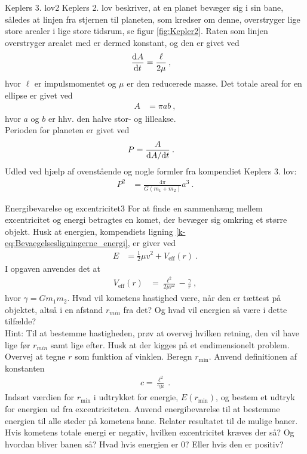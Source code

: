 %
\begin{opgave}{Keplers 3. lov}{2}
Keplers 2. lov beskriver, at en planet bevæger sig i sin bane, således at linjen fra stjernen til planeten, som kredser om denne, overstryger lige store arealer i lige store tidsrum, se figur \ref{fig:Kepler2}. Raten som linjen overstryger arealet med er dermed konstant, og den er givet ved
\begin{align*}
	\dif{t}{A} &= \frac{\ell}{2\mu} \: ,
\end{align*}
hvor $\ell$ er impulsmomentet og $\mu$ er den reducerede masse. Det totale areal for en ellipse er givet ved
\begin{align*}
	A &= \pi a b \: ,
\end{align*}
hvor $a$ og $b$ er hhv. den halve stor- og lilleakse.\\
Perioden for planeten er givet ved
\begin{align*}
	P &= \frac{A}{\d A / \d t} \: .
\end{align*}
%
\opg Udled ved hjælp af ovenstående og nogle formler fra kompendiet Keplers 3. lov:
\begin{align*}
	P^2 &= \frac{4\pi}{G(m_1+m_2)}a^3 \: .
\end{align*}
\end{opgave}
%
%
\begin{opgave}{Energibevarelse og excentricitet}{3}
For at finde en sammenhæng mellem excentricitet og energi betragtes en komet, der bevæger sig omkring et større objekt. Husk at energien, kompendiets ligning \eqref{k-eq:Bevaegelsesligningerne_energi}, er giver ved
\begin{align*}
	E &= \frac{1}{2}\mu v^2 + V_{\text{eff}}(r) \: .
\end{align*}
I opgaven anvendes det at
\begin{align*}
	V_{\text{eff}}(r) &= \frac{\ell^2}{2\mu r^2}-\frac{\gamma}{r} \: ,
\end{align*}
hvor $\gamma = Gm_1m_2$.
%
\opg Hvad vil kometens hastighed være, når den er tættest på objektet, altså i en afstand $r_{min}$ fra det? Og hvad vil energien så være i dette tilfælde?\\
Hint: Til at bestemme hastigheden, prøv at overvej hvilken retning, den vil have lige før $r_{min}$ samt lige efter. Husk at der kigges på et endimensionelt problem. Overvej at tegne $r$ som funktion af vinklen.
%
\opg Beregn $r_{\text{min}}$. Anvend definitionen af konstanten
\begin{align*}
	c = \frac{\ell^2}{\gamma\mu} \: .
\end{align*}
%
\opg Indsæt værdien for $r_{\text{min}}$ i udtrykket for energie, $E(r_{\text{min}})$, og bestem et udtryk for energien ud fra excentriciteten. Anvend energibevarelse til at bestemme energien til alle steder på kometens bane.
%
\opg Relater resultatet til de mulige baner. Hvis kometens totale energi er negativ, hvilken excentricitet kræves der så? Og hvordan bliver banen så? Hvad hvis energien er $0$? Eller hvis den er positiv?
\end{opgave}
%
%
%
